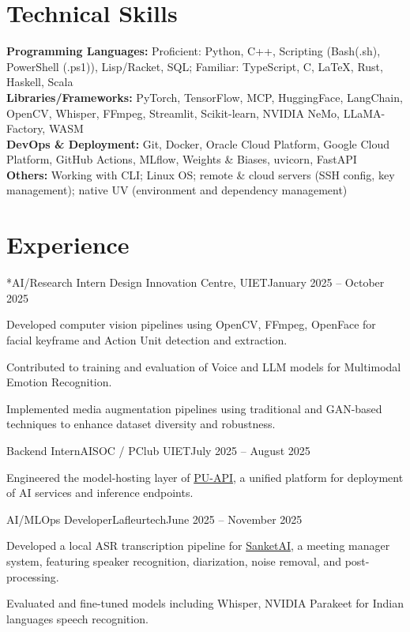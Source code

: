 \documentclass[10pt, letterpaper]{article}
\newcommand{\skillsentry}[2]{\textbf{#1:} {\RaggedRight #2}}
\newenvironment{compactskills}{%
    \begingroup\small\RaggedRight\setlength{\parskip}{2pt}\setlength{\parindent}{0pt}%
    \hyphenpenalty=500 \exhyphenpenalty=500 \sloppy%
}{\par\endgroup}
\begin{document}
\section{Technical Skills}
\begin{compactskills}
\skillsentry{Programming Languages}{Proficient: Python, C++, Scripting (Bash(.sh), PowerShell (.ps1)), Lisp/Racket, SQL; Familiar: TypeScript, C, LaTeX, Rust, Haskell, Scala}\\
\skillsentry{Libraries/Frameworks}{PyTorch, TensorFlow, MCP, HuggingFace, LangChain, OpenCV, Whisper, FFmpeg, Streamlit, Scikit-learn, NVIDIA NeMo, LLaMA-Factory, WASM}\\
\skillsentry{DevOps \& Deployment}{Git, Docker, Oracle Cloud Platform, Google Cloud Platform, GitHub Actions, MLflow, Weights \& Biases, uvicorn, FastAPI}\\
\skillsentry{Others}{Working with CLI; Linux OS; remote \& cloud servers (SSH config, key management); native UV (environment and dependency management)}\\
\end{compactskills}


\section{Experience}

\begin{experienceentry}*{AI/Research Intern }{Design Innovation Centre, UIET}{January 2025 -- October 2025}
    \item Developed computer vision pipelines using OpenCV, FFmpeg, OpenFace for facial keyframe and Action Unit detection and extraction.
    \item Contributed to training and evaluation of Voice and LLM models for Multimodal Emotion Recognition.
    \item Implemented media augmentation pipelines using traditional and GAN-based techniques to enhance dataset diversity and robustness.
    \begin{subexperienceentry}{Backend Intern}{AISOC / PClub UIET}{July 2025 -- August 2025}
        \item Engineered the model-hosting layer of \href{https://puapi.vercel.app/}{PU-API}, a unified platform for deployment of AI services and inference endpoints.
    \end{subexperienceentry}
\end{experienceentry}

\begin{experienceentry}{AI/MLOps Developer}{Lafleurtech}{June 2025 -- November 2025}
    \item Developed a local ASR transcription pipeline for \href{https://sanketai.co.in/}{SanketAI}, a meeting manager system, featuring speaker recognition, diarization, noise removal, and post-processing.
    \item Evaluated and fine-tuned models including Whisper, NVIDIA Parakeet for Indian languages speech recognition.
\end{experienceentry}
\end{document}

